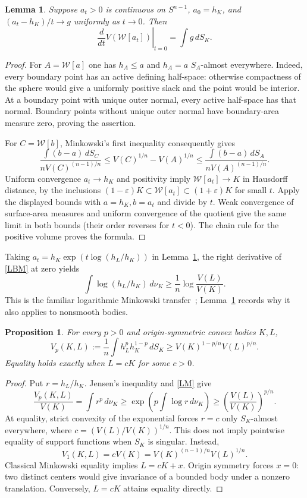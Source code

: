 \documentclass[11pt]{article}
\newtheorem{lemma}[theorem]{Lemma}
\newtheorem{proposition}[theorem]{Proposition}
\newcommand{\Sph}{S^{n-1}}
\newcommand{\W}{\mathcal W}
\begin{document}
\begin{lemma}\label{variation}
Suppose $a_t>0$ is continuous on $\Sph$, $a_0=h_K$, and $(a_t-h_K)/t\to g$ uniformly as $t\to0$. Then
\[
 \left.\frac{d}{dt}V(\W[a_t])\right|_{t=0}=\int g\,dS_K.
\]
\end{lemma}
\begin{proof}
For $A=\W[a]$ one has $h_A\le a$ and $h_A=a$ $S_A$-almost everywhere. Indeed, every boundary point has an active defining half-space: otherwise compactness of the sphere would give a uniformly positive slack and the point would be interior. At a boundary point with unique outer normal, every active half-space has that normal. Boundary points without unique outer normal have boundary-area measure zero, proving the assertion.

For $C=\W[b]$, Minkowski's first inequality consequently gives
\[
 \frac{\int(b-a)\,dS_C}{nV(C)^{(n-1)/n}}
 \le V(C)^{1/n}-V(A)^{1/n}
 \le\frac{\int(b-a)\,dS_A}{nV(A)^{(n-1)/n}}.
\]
Uniform convergence $a_t\to h_K$ and positivity imply $\W[a_t]\to K$ in Hausdorff distance, by the inclusions $(1-\varepsilon)K\subset\W[a_t]\subset(1+\varepsilon)K$ for small $t$. Apply the displayed bounds with $a=h_K,b=a_t$ and divide by $t$. Weak convergence of surface-area measures and uniform convergence of the quotient give the same limit in both bounds (their order reverses for $t<0$). The chain rule for the positive volume proves the formula.
\end{proof}

Taking $a_t=h_K\exp(t\log(h_L/h_K))$ in Lemma~\ref{variation}, the right derivative of \eqref{LBM} at zero yields
\begin{equation}\label{LM}
 \int\log(h_L/h_K)\,d\nu_K\ge\frac1n\log\frac{V(L)}{V(K)}.
\end{equation}
This is the familiar logarithmic Minkowski transfer~\cite[Lemma 3.2]{BLYZ}; Lemma~\ref{variation} records why it also applies to nonsmooth bodies.

\begin{proposition}\label{strict}
For every $p>0$ and origin-symmetric convex bodies $K,L$,
\begin{equation}\label{mixed}
 V_p(K,L):=\frac1n\int h_L^p h_K^{1-p}\,dS_K
 \ge V(K)^{1-p/n}V(L)^{p/n}.
\end{equation}
Equality holds exactly when $L=cK$ for some $c>0$.
\end{proposition}
\begin{proof}
Put $r=h_L/h_K$. Jensen's inequality and \eqref{LM} give
\[
 \frac{V_p(K,L)}{V(K)}=\int r^p\,d\nu_K
 \ge\exp\left(p\int\log r\,d\nu_K\right)
 \ge\left(\frac{V(L)}{V(K)}\right)^{p/n}.
\]
At equality, strict convexity of the exponential forces $r=c$ only $S_K$-almost everywhere, where $c=(V(L)/V(K))^{1/n}$. This does not imply pointwise equality of support functions when $S_K$ is singular. Instead,
\[
 V_1(K,L)=cV(K)=V(K)^{(n-1)/n}V(L)^{1/n}.
\]
Classical Minkowski equality implies $L=cK+x$. Origin symmetry forces $x=0$: two distinct centers would give invariance of a bounded body under a nonzero translation. Conversely, $L=cK$ attains equality directly.
\end{proof}
\end{document}
